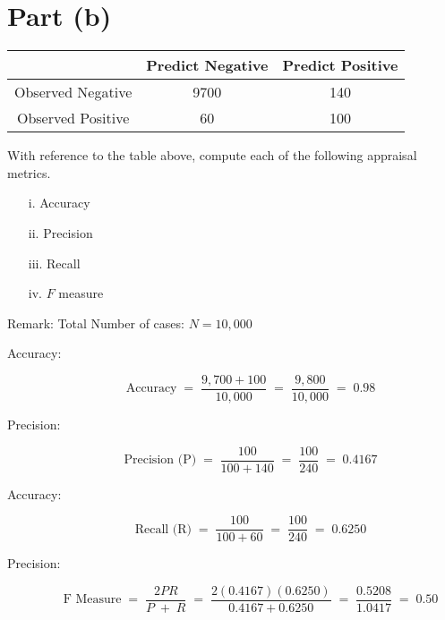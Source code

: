 \documentclass[a4paper,12pt]{article}
\begin{document}
	\section*{Part (b)}	
	\begin{center}
		\begin{tabular}{|c|c|c|}
			\hline  & \phantom{spa}Predict Negative\phantom{spa} & \phantom{spa}Predict Positive\phantom{spa} \\ 
			\hline Observed Negative &	9700	&	140	\\ 
			\hline Observed Positive & 	60	&	100	\\ 
			\hline 
		\end{tabular} 
	\end{center}


\medskip 
\begin{framed}
\noindent With reference to the table above, compute each of the following appraisal metrics.
\begin{multicols}{2} 
	\begin{itemize}
		\item [i.] Accuracy
		\item [ii.] Precision
		\item [iii.] Recall
		\item [iv.] $F$ measure
	\end{itemize}
\end{multicols}
\end{framed}
\medskip 


\noindent Remark: Total Number of cases: $N=10,000$
\begin{description}
\item[Accuracy:]

\[ \mbox{Accuracy} \;=\;\frac{9,700 + 100}{10,000}  \;=\;\frac{9,800}{10,000} \;=\;0.98 \] 
\item[Precision:]

\[ \mbox{Precision (P)} \;=\;\frac{100}{100+140}  \;=\;\frac{100}{240} \;=\;0.4167 \] 
\item[Accuracy:]

\[ \mbox{Recall (R)} \;=\;\frac{100}{100+60}  \;=\;\frac{100}{240} \;=\;0.6250 \] 
\item[Precision:]

\[ \mbox{F Measure} \;=\;\frac{2PR}{P\;+\;R}  \;=\;\frac{2(0.4167)(0.6250)}{ 0.4167 + 0.6250} \;=\;\frac{0.5208}{1.0417} \;=\;0.50 \] 

\end{description}
\newpage 
\end{document}

